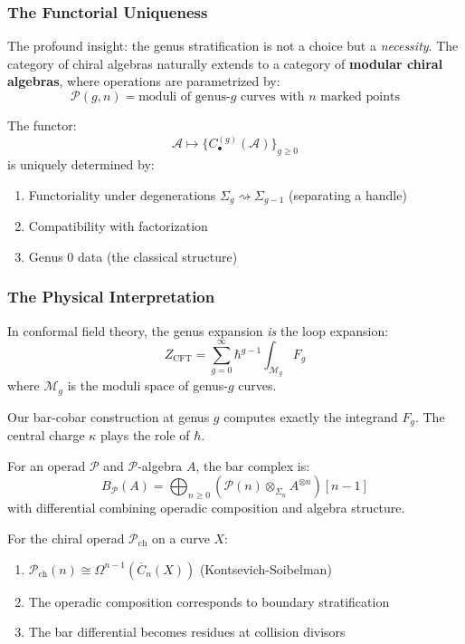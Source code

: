 \begin{example}
\subsubsection{The Functorial Uniqueness}

The profound insight: the genus stratification is not a choice but a \emph{necessity}.
The category of chiral algebras naturally extends to a category of \textbf{modular
chiral algebras}, where operations are parametrized by:
$$\mathcal{P}(g,n) = \text{moduli of genus-}g\text{ curves with }n\text{ marked points}$$

The functor:
$$\mathcal{A} \mapsto \{ C_{\bullet}^{(g)}(\mathcal{A}) \}_{g \geq 0}$$
is uniquely determined by:
\begin{enumerate}
\item Functoriality under degenerations $\Sigma_g \rightsquigarrow \Sigma_{g-1}$
(separating a handle)
\item Compatibility with factorization
\item Genus 0 data (the classical structure)
\end{enumerate}

\subsubsection{The Physical Interpretation}

In conformal field theory, the genus expansion \emph{is} the loop expansion:
$$Z_{\text{CFT}} = \sum_{g=0}^{\infty} \hbar^{g-1} \int_{\mathcal{M}_g} F_g$$
where $\mathcal{M}_g$ is the moduli space of genus-$g$ curves.

Our bar-cobar construction at genus $g$ computes exactly the integrand $F_g$.
The central charge $\kappa$ plays the role of $\hbar$.

\begin{theorem}\label{thm:operadic-bar}
For an operad $\mathcal{P}$ and $\mathcal{P}$-algebra $A$, the bar complex is:
$$B_{\mathcal{P}}(A) = \bigoplus_{n \geq 0} (\mathcal{P}(n) \otimes_{\Sigma_n} A^{\otimes n})[n-1]$$
with differential combining operadic composition and algebra structure.
\end{theorem}

\begin{theorem}\label{thm:geometric-bridge}
For the chiral operad $\mathcal{P}_{\text{ch}}$ on a curve $X$:
\begin{enumerate}
\item $\mathcal{P}_{\text{ch}}(n) \cong \Omega^{n-1}(\overline{C}_n(X))$ (Kontsevich-Soibelman)
\item The operadic composition corresponds to boundary stratification
\item The bar differential becomes residues at collision divisors
\end{enumerate}


\end{theorem}
\end{example}
